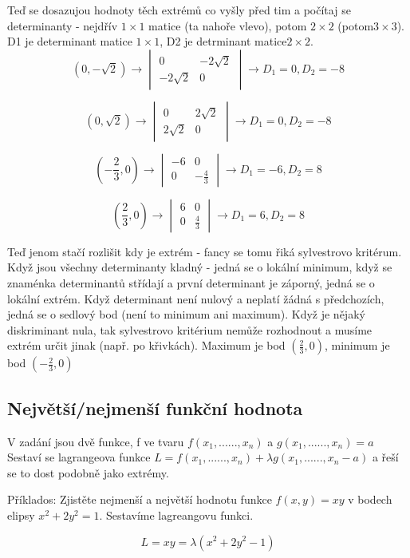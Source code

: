 \documentclass[12pt, letterpaper]{article}
\begin{document}
Teď se dosazujou hodnoty těch extrémů co vyšly před tim a počítaj se determinanty - nejdřív $1\times1$ matice (ta nahoře vlevo), potom $2\times2$ (potom$3\times3$).
D1 je determinant matice $1\times1$, D2 je detrminant matice$2\times2$.
\[(0, -\sqrt{2}) \to
\begin{vmatrix}
0 & -2\sqrt{2}\\
-2\sqrt{2} & 0 
\end{vmatrix} \to
D_1 = 0, D_2 = - 8\]

\[(0, \sqrt{2}) \to
\begin{vmatrix}
0 & 2\sqrt{2}\\
2\sqrt{2} & 0 
\end{vmatrix} \to
D_1 = 0, D_2 = - 8\]

\[\left(-\frac{2}{3}, 0\right) \to
\begin{vmatrix}
-6 & 0\\
0 & -\frac{4}{3} 
\end{vmatrix} \to
D_1 = -6, D_2 = 8\]

\[\left(\frac{2}{3}, 0\right) \to
\begin{vmatrix}
6 & 0\\
0 & \frac{4}{3} 
\end{vmatrix} \to
D_1 = 6, D_2 = 8\]


Teď jenom stačí rozlišit kdy je extrém - fancy se tomu řiká sylvestrovo kritérum. Když jsou všechny determinanty kladný - jedná se o lokální minimum, 
když se znaménka determinantů střídají a první determinant je záporný, jedná se o lokální extrém.
Když determinant není nulový a neplatí žádná s předchozích, jedná se o sedlový bod (není to minimum ani maximum).
Když je nějaký diskriminant nula, tak sylvestrovo kritérium nemůže rozhodnout a musíme extrém určit jinak (např. po křivkách).
Maximum je bod $(\frac{2}{3},0)$, minimum je bod $(-\frac{2}{3},0)$

\subsection*{Největší/nejmenší funkční hodnota}
V zadání jsou dvě funkce, f ve tvaru $f(x_1, ......, x_n)$ a $g(x_1, ......, x_n) = a$
Sestaví se lagrangeova funkce $L =f(x_1, ......, x_n)  + \lambda g(x_1, ......, x_n - a)$ a řeší se to dost podobně jako extrémy.

Příklados:
Zjistěte nejmenší a největší hodnotu funkce  $f(x,y) = xy$ v bodech elipsy $x^2 + 2y^2 = 1$. Sestavíme lagreangovu funkci.

\[L = xy = \lambda(x^2 + 2y^2 - 1)\]
\end{document}
